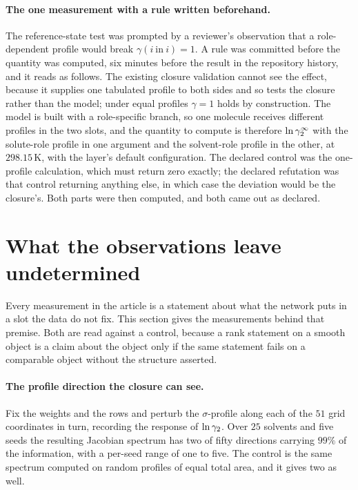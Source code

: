 \paragraph{The one measurement with a rule written beforehand.}
The reference-state test was prompted by a reviewer's observation that a role-dependent profile
would break $\gamma(i\ \mathrm{in}\ i)=1$. A rule was committed before the quantity was computed,
six minutes before the result in the repository history, and it reads as follows. The existing
closure validation cannot see the effect, because it supplies one tabulated profile to both sides
and so tests the closure rather than the model; under equal profiles $\gamma=1$ holds by
construction. The model is built with a role-specific branch, so one molecule receives different
profiles in the two slots, and the quantity to compute is therefore $\ln\gamma_2^\infty$ with the solute-role
profile in one argument and the solvent-role profile in the other, at $298.15$\,K, with the layer's
default configuration. The declared control was the one-profile calculation, which must return zero
exactly; the declared refutation was that control returning anything else, in which case the
deviation would be the closure's. Both parts were then computed, and both came out as declared.

\section{What the observations leave undetermined}
\label{si:unresolved}

Every measurement in the article is a statement about what the network puts in a slot the data do
not fix. This section gives the measurements behind that premise. Both are read against a control,
because a rank statement on a smooth object is a claim about the object only if the same statement
fails on a comparable object without the structure asserted.

\paragraph{The profile direction the closure can see.}
Fix the weights and the rows and perturb the $\sigma$-profile along each of the $51$ grid
coordinates in turn, recording the response of $\ln\gamma_2$. Over $25$ solvents and five seeds the
resulting Jacobian spectrum has two of fifty directions carrying $99\%$ of the information, with a
per-seed range of one to five. The control is the same spectrum computed on random profiles of
equal total area, and it gives two as well.

